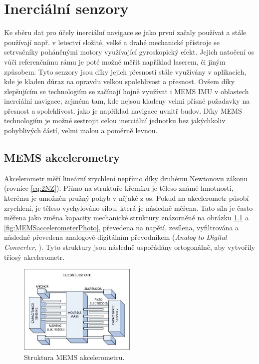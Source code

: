 \chapter{Inerciální senzory}
Ke sběru dat pro účely inerciální navigace se jako první začaly používat a stále používají např. v letectví složité, velké a drahé mechanické přístroje se setrvačníky poháněnými motory využívající gyroskopický efekt. Jejich natočení os vůči referenčnímu rámu je poté možné měřit například laserem, či jiným způsobem. Tyto senzory jsou díky jejich přesnosti stále využívány v aplikacích, kde je kladen důraz na opravdu velkou spolehlivost a přesnost. Ovšem díky zlepšujícím se technologiím se začínají hojně využívat i \ac{MEMS} \ac{IMU} v oblastech inerciální navigace, zejména tam, kde nejsou kladeny velmi přísné požadavky na přesnost a spolehlivost, jako je například navigace uvnitř budov. Díky \ac{MEMS} technologiím je možné sestrojit celou inerciální jednotku bez jakýchkoliv pohyblivých částí, velmi malou a poměrně levnou. \cite{Tittertonc2004} \cite{Grewal2013}

\section{MEMS akcelerometry} \label{MEMSaccel}
Akcelerometr měří lineární zrychlení nepřímo díky druhému Newtonovu zákonu (rovnice \ref{eq:2NZ}). Přímo na struktuře křemíku je těleso známé hmotnosti, kterému je umožněn pružný pohyb v nějaké z os. Pokud na akcelerometr působí zrychlení, je těleso vychylováno silou, která je následně měřena. Tato síla je často měřena jako změna kapacity mechanické struktury znázorněné na obrázku \ref{fig:MEMSaccelerometer} a \ref{fig:MEMSaccelerometerPhoto}, převedena na napětí, zesílena, vyfiltrována a následně převedena analogově-digitálním převodníkem (\emph{Analog to Digital Converter}, ).
Tyto struktury jsou následně uspořádány ortogonálně, aby vytvořily tříosý akcelerometr. \cite{Dadafshar2014}

\begin{figure}[h]
    \centering
    \includegraphics[width=0.5\textwidth]{obrazky/MEMSaccelerometer}
    \caption{Struktura MEMS akcelerometru. \cite{Dadafshar2014}}
    \label{fig:MEMSaccelerometer}
\end{figure}

